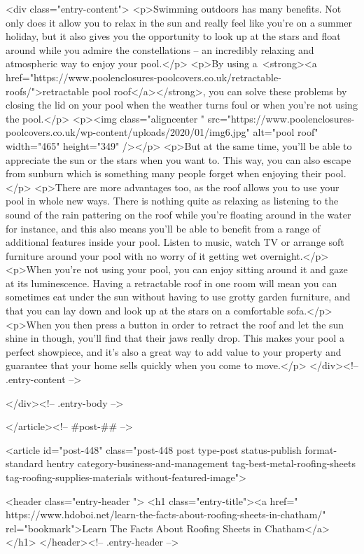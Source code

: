 				<div class="entry-content">
			<p>Swimming outdoors has many benefits. Not only does it allow you to relax in the sun and really feel like you’re on a summer holiday, but it also gives you the opportunity to look up at the stars and float around while you admire the constellations – an incredibly relaxing and atmospheric way to enjoy your pool.</p>
<p>By using a <strong><a href="https://www.poolenclosures-poolcovers.co.uk/retractable-roofs/">retractable pool roof</a></strong>, you can solve these problems by closing the lid on your pool when the weather turns foul or when you’re not using the pool.</p>
<p><img class="aligncenter " src="https://www.poolenclosures-poolcovers.co.uk/wp-content/uploads/2020/01/img6.jpg" alt="pool roof" width="465" height="349" /></p>
<p>But at the same time, you’ll be able to appreciate the sun or the stars when you want to. This way, you can also escape from sunburn which is something many people forget when enjoying their pool.</p>
<p>There are more advantages too, as the roof allows you to use your pool in whole new ways. There is nothing quite as relaxing as listening to the sound of the rain pattering on the roof while you’re floating around in the water for instance, and this also means you’ll be able to benefit from a range of additional features inside your pool. Listen to music, watch TV or arrange soft furniture around your pool with no worry of it getting wet overnight.</p>
<p>When you’re not using your pool, you can enjoy sitting around it and gaze at its luminescence. Having a retractable roof in one room will mean you can sometimes eat under the sun without having to use grotty garden furniture, and that you can lay down and look up at the stars on a comfortable sofa.</p>
<p>When you then press a button in order to retract the roof and let the sun shine in though, you’ll find that their jaws really drop. This makes your pool a perfect showpiece, and it’s also a great way to add value to your property and guarantee that your home sells quickly when you come to move.</p>
					</div><!-- .entry-content -->
		
		
			</div><!-- .entry-body -->

</article><!-- #post-## -->

			
				
<article id="post-448" class="post-448 post type-post status-publish format-standard hentry category-business-and-management tag-best-metal-roofing-sheets tag-roofing-supplies-materials without-featured-image">

	
	<header class="entry-header ">
					<h1 class="entry-title"><a href=" https://www.hdoboi.net/learn-the-facts-about-roofing-sheets-in-chatham/" rel="bookmark">Learn The Facts About Roofing Sheets in Chatham</a></h1>			</header><!-- .entry-header -->

